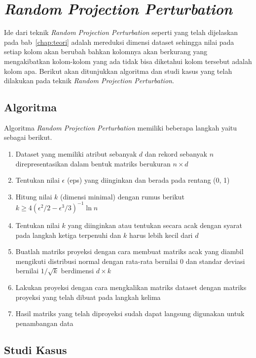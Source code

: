 \section{\textit{Random Projection Perturbation}}
\label{subsec:rpp}

Ide dari teknik \textit{Random Projection Perturbation} seperti yang telah dijelaskan pada bab~\ref{chap:teori} adalah mereduksi dimensi dataset sehingga nilai pada setiap kolom akan berubah bahkan kolomnya akan berkurang yang mengakibatkan kolom-kolom yang ada tidak bisa diketahui kolom tersebut adalah kolom apa. Berikut akan ditunjukkan algoritma dan studi kasus yang telah dilakukan pada teknik \textit{Random Projection Perturbation}.

\subsection{Algoritma}
\label{subsec:algo-projection}

Algoritma \textit{Random Projection Perturbation} memiliki beberapa langkah yaitu sebagai berikut.
\begin{enumerate}
    \item Dataset yang memiliki atribut sebanyak \(d\) dan rekord sebanyak \(n\) direpresentasikan dalam bentuk matriks berukuran \(n \times d\)
    \item Tentukan nilai \(\epsilon\) (eps) yang diinginkan dan berada pada rentang (0, 1)
    \item Hitung nilai \(k\) (dimensi minimal) dengan rumus berikut \(k \geq 4(\epsilon^{2}/2-\epsilon^{3}/3)^{-1}\ln{n}\)
    \item Tentukan nilai \(k\) yang diinginkan atau tentukan secara acak dengan syarat pada langkah ketiga terpenuhi dan \(k\) harus lebih kecil dari \(d\)
    \item Buatlah matriks proyeksi dengan cara membuat matriks acak yang diambil mengikuti distribusi normal dengan rata-rata bernilai 0 dan standar deviasi bernilai \(1/\sqrt{k}\) berdimensi \(d \times k\)
    \item Lakukan proyeksi dengan cara mengkalikan matriks dataset dengan matriks proyeksi yang telah dibuat pada langkah kelima
    \item Hasil matriks yang telah diproyeksi sudah dapat langsung digunakan untuk penambangan data
\end{enumerate}

\subsection{Studi Kasus}
\label{subsec:studi-kasus-projection}

